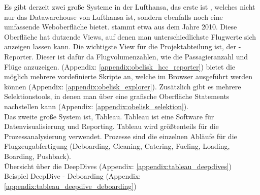 		Es gibt derzeit zwei große Systeme in der Lufthansa, das erste ist , welches nicht nur das Datawarehouse von Lufthansa ist, sondern ebenfalls noch eine umfassende Weboberfläche bietet.  stammt etwa aus dem Jahre 2010.
		Diese Oberfläche hat dutzende Views, auf denen man unterschiedlichste Flugwerte sich anzeigen lassen kann. Die wichtigste View für die Projektabteilung ist, der -Reporter. Dieser ist dafür da Flugvolumenzahlen, wie die Passagieranzahl und Flüge anzuzeigen.
		(Appendix: \ref{appendix:obelisk_hcc_reporter})
		 bietet die möglich mehrere vordefinierte  Skripte an, welche im Browser ausgeführt werden können (Appendix: \ref{appendix:obelisk_explorer}).
		Zusätzlich gibt es mehrere Selektionstools, in denen man über eine grafische Oberfläche  Statements nachstellen kann (Appendix: \ref{appendix:obelisk_selektion}).\\

		Das zweite große System ist, Tableau. Tableau ist eine Software für Datenvisualisierung und Reporting. Tableau wird größtenteils für die Prozessanalysierung verwendet. Prozesse sind die einzelnen Abläufe für die Flugzeugabfertigung (Deboarding, Cleaning, Catering, Fueling, Loading, Boarding, Pushback).\\
		
		Übersicht über die DeepDives (Appendix: \ref{appendix:tableau_deepdives})\\
		Beispiel DeepDive - Deboarding (Appendix: \ref{appendix:tableau_deepdive_deboarding})